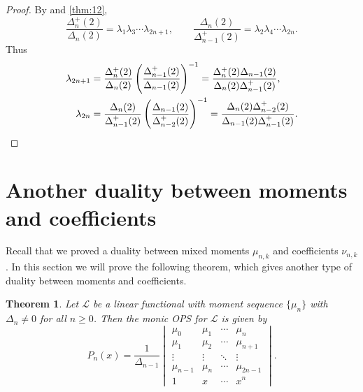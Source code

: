 \documentclass[oneside]{book}
\numberwithin{equation}{section}
\newtheorem{thm}{Theorem}[section]
\theoremstyle{definition}
\newcommand\LL{\mathcal{L}}
\begin{document}
\begin{proof}
By  and \ref{thm:12},
\[
\frac{\Delta^+_n(2)}{\Delta_{n}(2)}  = \lambda_1 \lambda_3 \cdots \lambda_{2n+1}, \qquad  
\frac{\Delta_n(2)}{\Delta^+_{n-1}(2)}  = \lambda_2 \lambda_4 \cdots \lambda_{2n}.
\]
Thus
\begin{align*}
  \lambda_{2n+1}
  &= \frac{\Delta^+_n(2)}{\Delta_{n}(2)} \left( \frac{\Delta^+_{n-1}(2)}{\Delta_{n-1}(2)} \right)^{-1}
    = \frac{\Delta^+_n(2)\Delta_{n-1}(2)}{\Delta_{n}(2)\Delta^+_{n-1}(2)},\\
  \lambda_{2n}
  &= \frac{\Delta_n(2)}{\Delta^+_{n-1}(2)} \left( \frac{\Delta_{n-1}(2)}{\Delta^+_{n-2}(2)} \right)^{-1}
    = \frac{\Delta_n(2)\Delta^+_{n-2}(2)}{\Delta_{n-1}(2)\Delta^+_{n-1}(2)}.
    \qedhere
\end{align*}

\end{proof}



\section{Another duality between moments and coefficients}

Recall that we proved a duality between mixed moments \( \mu_{n,k} \)
and coefficients \( \nu_{n,k} \). In this section we will prove the
following theorem, which gives another type of duality between moments
and coefficients.


\begin{thm}\label{thm:10}
  Let \( \LL \) be a linear functional with moment sequence
  \( \{\mu_n\} \) with \( \Delta_n\ne 0 \) for all \( n\ge0 \).
  Then the monic OPS for \( \LL \) is given by
  \[
    P_n(x) = \frac{1}{\Delta_{n-1}}
    \begin{vmatrix}
      \mu_0 & \mu_1 & \cdots & \mu_n\\
      \mu_1 & \mu_2 & \cdots & \mu_{n+1}\\
      \vdots & \vdots & \ddots & \vdots\\
      \mu_{n-1} & \mu_{n} & \cdots & \mu_{2n-1}\\
      1 & x & \cdots & x^n
    \end{vmatrix}.
  \]
\end{thm}
\end{document}
